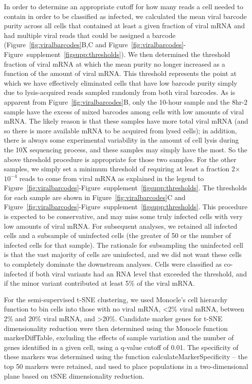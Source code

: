 \documentclass[9pt,lineno]{elife}
\begin{document}
In order to determine an appropriate cutoff for how many reads a cell needed to contain in order to be classified as infected, we calculated the mean viral barcode purity across all cells that contained at least a given fraction of viral mRNA and had multiple viral reads that could be assigned a barcode (Figure~\ref{fig:viralbarcodes}B,C and Figure~\ref{fig:viralbarcodes}-Figure~supplement~\ref{figsupp:thresholds}).
We then determined the threshold fraction of viral mRNA at which the mean purity no longer increased as a function of the amount of viral mRNA.
This threshold represents the point at which we have effectively eliminated cells that have low barcode purity simply due to lysis-acquired reads sampled randomly from both viral barcodes.
As is apparent from Figure~\ref{fig:viralbarcodes}B, only the 10-hour sample and the 8hr-2 sample have the excess of mixed barcodes among cells with low amounts of viral mRNA.
The likely reason is that these samples have more total viral mRNA (and so there is more available mRNA to be acquired from lysed cells); in addition, there is always some experimental variability in the amount of cell lysis during the 10X sequencing process, and these samples may simply have the most.
So the above threshold procedure is appropriate for those two samples.
For the other samples, we simply set a minimum threshold of requiring at least a fraction 2$\times$$10^{-4}$ reads to come from viral mRNA as explained in the legend to Figure~\ref{fig:viralbarcodes}-Figure~supplement~\ref{figsupp:thresholds}.
The thresholds for each sample are shown in Figure~\ref{fig:viralbarcodes}C and Figure~\ref{fig:viralbarcodes}-Figure~supplement~\ref{figsupp:thresholds}.
This procedure is expected to be conservative, and may miss some truly infected cells with very low amounts of viral mRNA.
For subsequent analyses, we retained all infected cells and a subsample of uninfected cells (the greater of 50 or the number of infected cells for that sample).
The rationale for subsampling the uninfected cell is that the vast majority of cells are uninfected, and we did not want these cells to completely dominate the downstream analyses.
Cells were classified as co-infected if both viral variants had an RNA level that exceeded the threshold, and if the minor variant contributed at least 5\% of the viral mRNA.

For the semi-supervised t-SNE clustering, we used Monocle's cell hierarchy function to bin cells into those with no viral mRNA, <2\% viral mRNA, between 2\% and 20\% viral mRNA, and >20\%. 
Candidate marker genes for t-SNE dimensionality reduction were then determined using the Monocle function markerDiffTable, excluding the effects of sample variation and the number of genes identified in a given cell, using a q-value cutoff of 0.01.
The specificity of these markers was determined using the function calculateMarkerSpecificity -- the top 50 markers were retained, and used to place populations in a two-dimensional plane based on tSNE dimensionality reduction.
\end{document}
